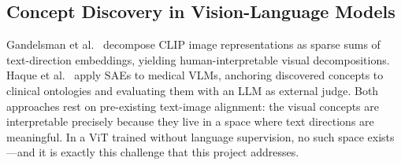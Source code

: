 \subsection{Concept Discovery in Vision-Language Models}
Gandelsman et al.\ \cite{Gandelsman2024} decompose CLIP image representations as sparse sums of text-direction embeddings, yielding human-interpretable visual decompositions. Haque et al.\ \cite{Haque2026} apply SAEs to medical VLMs, anchoring discovered concepts to clinical ontologies and evaluating them with an LLM as external judge. Both approaches rest on pre-existing text-image alignment: the visual concepts are interpretable precisely because they live in a space where text directions are meaningful. In a ViT trained without language supervision, no such space exists---and it is exactly this challenge that this project addresses.
